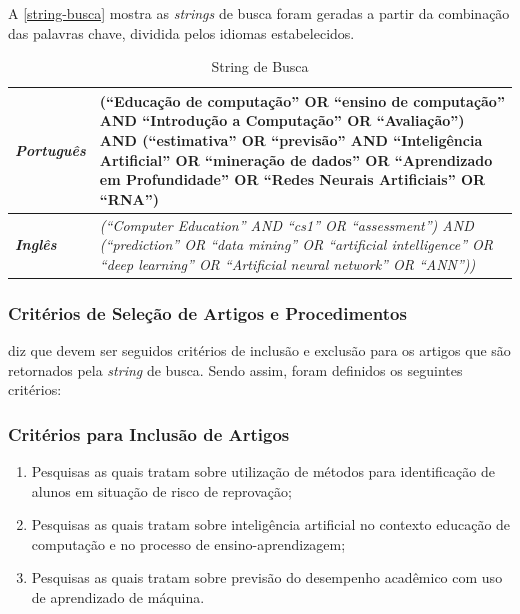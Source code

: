 \documentclass[
	12pt,				%
	openright,			%
	oneside,
	a4paper,			%
	english,			%
	french,				%
	spanish,			%
	brazil,				%
	]{abntex2}
\begin{document}
A \autoref{string-busca} mostra as \textit{strings} de busca foram geradas a partir da combinação das palavras chave, dividida pelos idiomas estabelecidos.

\begin{center}
\begin{longtable}{|| p{3cm} || p{10cm} ||}
\caption{String de Busca}
\label{string-busca}
\hline
\textit{\textbf{Português}} & (``Educação de computação'' OR ``ensino de computação'' AND ``Introdução a Computação'' OR ``Avaliação'') AND (``estimativa'' OR ``previsão'' AND ``Inteligência Artificial'' OR ``mineração de dados'' OR ``Aprendizado em Profundidade'' OR ``Redes Neurais Artificiais'' OR ``RNA'')\\
\hline \hline
\textit{\textbf{Inglês}} & \textit{(``Computer Education'' AND ``cs1'' OR ``assessment'') AND (``prediction'' OR ``data mining'' OR ``artificial intelligence'' OR ``deep learning'' OR ``Artificial neural network'' OR ``ANN''))}\\
 \hline \hline
\end{longtable}
\end{center}

\subsubsection{Critérios de Seleção de Artigos e Procedimentos}
 diz que devem ser seguidos critérios de inclusão e exclusão para os artigos que são retornados pela \textit{string} de busca. Sendo assim, foram definidos os seguintes critérios:

\subsubsection{Critérios para Inclusão de Artigos}

\begin{enumerate}
    \item Pesquisas as quais tratam sobre utilização de métodos para identificação de alunos em situação de risco de reprovação;
    \item Pesquisas as quais tratam sobre inteligência artificial no contexto educação de computação e no processo de ensino-aprendizagem;
    \item Pesquisas as quais tratam sobre previsão do desempenho acadêmico com uso de aprendizado de máquina.
\end{enumerate}
\end{document}
